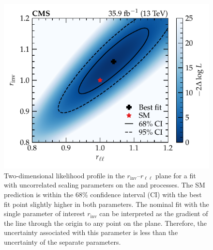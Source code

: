 \begin{figure}
    \centering
    \includegraphics{chapters/043_results/images/finalfit-scan-2d.pdf}
    \caption[Two-dimensional likelihood profile in the $r_{\mathrm{inv}}$--$r_{\ell\ell}$ plane.]{
        Two-dimensional likelihood profile in the $r_{\mathrm{inv}}$--$r_{\ell\ell}$ plane for a fit with uncorrelated scaling parameters on the \IZvvj and \IZllj processes. The SM prediction is within the $68\%$ confidence interval (CI) with the best fit point slightly higher in both parameters. The nominal fit with the single parameter of interest $r_{\mathrm{inv}}$ can be interpreted as the gradient of the line through the origin to any point on the plane. Therefore, the uncertainty associated with this parameter is less than the uncertainty of the separate parameters.
    }
    \label{fig:finalfit-scan-2d}
\end{figure}
%

